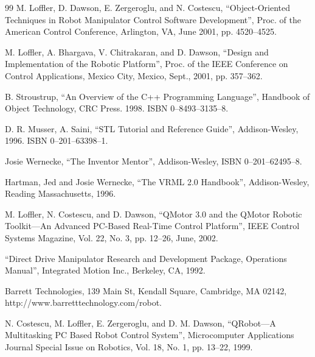 \documentclass[UTF8,a4paper,12pt]{ctexart}
\begin{document}
\begin{thebibliography}{99}
 M. Loffler, D. Dawson, E. Zergeroglu, and N. Costescu, ``Object-Oriented Techniques in Robot Manipulator Control Software Development'', Proc. of the American Control Conference, Arlington, VA, June 2001, pp. 4520--4525.

 M. Loffler, A. Bhargava, V. Chitrakaran, and D. Dawson, ``Design and Implementation of the Robotic Platform'', Proc. of the IEEE Conference on Control Applications, Mexico City, Mexico, Sept., 2001, pp. 357--362.

 B. Stroustrup, ``An Overview of the C++ Programming Language'', Handbook of Object Technology, CRC Press. 1998. ISBN 0--8493--3135--8.

 D. R. Musser, A. Saini, ``STL Tutorial and Reference Guide'', Addison-Wesley, 1996. ISBN 0--201--63398--1.

 Josie Wernecke, ``The Inventor Mentor'', Addison-Wesley, ISBN 0--201--62495--8.

 Hartman, Jed and Josie Wernecke, ``The VRML 2.0 Handbook'', Addison-Wesley, Reading Massachusetts, 1996.

 M. Loffler, N. Costescu, and D. Dawson, ``QMotor 3.0 and the QMotor Robotic Toolkit---An Advanced PC-Based Real-Time Control Platform'', IEEE Control Systems Magazine, Vol. 22, No. 3, pp. 12--26, June, 2002.

 ``Direct Drive Manipulator Research and Development Package, Operations Manual'', Integrated Motion Inc., Berkeley, CA, 1992.

 Barrett Technologies, 139 Main St, Kendall Square, Cambridge, MA 02142, http://www.barretttechnology.com/robot.

 N. Costescu, M. Loffler, E. Zergeroglu, and D. M. Dawson, ``QRobot---A Multitasking PC Based Robot Control System'', Microcomputer Applications Journal Special Issue on Robotics, Vol. 18, No. 1, pp. 13--22, 1999.

\end{thebibliography}

\ifstandalone
  
\end{document}
